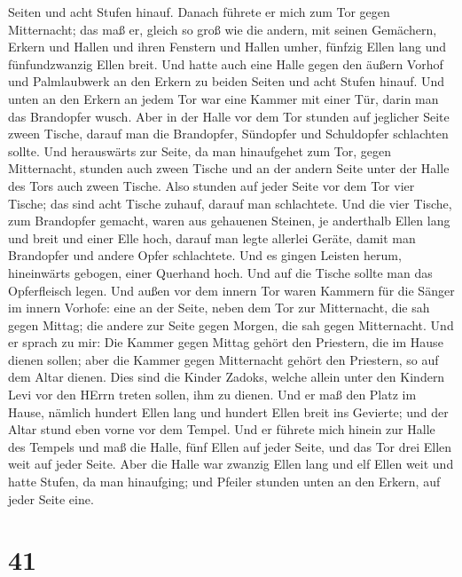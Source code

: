Seiten und acht Stufen hinauf.  Danach führete er mich zum
Tor gegen Mitternacht; das maß er, gleich so groß wie die andern,
 mit seinen Gemächern, Erkern und Hallen und ihren Fenstern
und Hallen umher, fünfzig Ellen lang und fünfundzwanzig Ellen breit.
 Und hatte auch eine Halle gegen den äußern Vorhof und
Palmlaubwerk an den Erkern zu beiden Seiten und acht Stufen hinauf.
 Und unten an den Erkern an jedem Tor war eine Kammer mit
einer Tür, darin man das Brandopfer wusch.  Aber in der
Halle vor dem Tor stunden auf jeglicher Seite zween Tische, darauf man
die Brandopfer, Sündopfer und Schuldopfer schlachten sollte.
 Und herauswärts zur Seite, da man hinaufgehet zum Tor,
gegen Mitternacht, stunden auch zween Tische und an der andern Seite
unter der Halle des Tors auch zween Tische.  Also stunden
auf jeder Seite vor dem Tor vier Tische; das sind acht Tische zuhauf,
darauf man schlachtete.  Und die vier Tische, zum
Brandopfer gemacht, waren aus gehauenen Steinen, je anderthalb Ellen
lang und breit und einer Elle hoch, darauf man legte allerlei Geräte,
damit man Brandopfer und andere Opfer schlachtete.  Und es
gingen Leisten herum, hineinwärts gebogen, einer Querhand hoch. Und auf
die Tische sollte man das Opferfleisch legen.  Und außen
vor dem innern Tor waren Kammern für die Sänger im innern Vorhofe: eine
an der Seite, neben dem Tor zur Mitternacht, die sah gegen Mittag; die
andere zur Seite gegen Morgen, die sah gegen Mitternacht. 
Und er sprach zu mir: Die Kammer gegen Mittag gehört den Priestern, die
im Hause dienen sollen;  aber die Kammer gegen Mitternacht
gehört den Priestern, so auf dem Altar dienen. Dies sind die Kinder
Zadoks, welche allein unter den Kindern Levi vor den HErrn treten
sollen, ihm zu dienen.  Und er maß den Platz im Hause,
nämlich hundert Ellen lang und hundert Ellen breit ins Gevierte; und der
Altar stund eben vorne vor dem Tempel.  Und er führete mich
hinein zur Halle des Tempels und maß die Halle, fünf Ellen auf jeder
Seite, und das Tor drei Ellen weit auf jeder Seite.  Aber
die Halle war zwanzig Ellen lang und elf Ellen weit und hatte Stufen, da
man hinaufging; und Pfeiler stunden unten an den Erkern, auf jeder Seite
eine.

\hypertarget{section-40}{%
\section{41}\label{section-40}}

